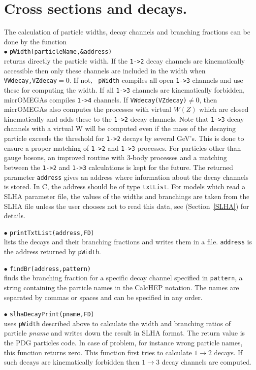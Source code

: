 \documentclass[12pt,a4paper]{article}
\begin{document}
\section{Cross sections and decays.}
\label{cross_section}

The calculation of particle widths, decay channels  and branching fractions
can be done by the function\\

\noindent
$\bullet$ \verb|pWidth(particleName,&address)|\\
returns directly the particle width. If the  \verb|1->2| 
decay channels are kinematically accessible then only these channels are
included in the width when \verb|VWdecay,VZdecay|$ = 0$.  If not, {\tt
pWidth} compiles all open \verb|1->3| channels and use these for  computing the width.
If all \verb|1->3| channels are kinematically forbidden, micrOMEGAs compiles \verb|1->4| channels.
If \verb|VWdecay(VZdecay)|$\ne 0$, then micrOMEGAs  also computes the processes with virtual $W(Z)$ which 
are closed kinematically and adds these to the \verb|1->2| decay channels.
 Note that \verb|1->3| decay channels with a virtual W  will be computed even
if the mass of the decaying particle exceeds the threshold for \verb|1->2| decays by several GeV's. This is done to ensure a 
proper matching of \verb|1->2| and \verb|1->3| processes.  For  particles other than gauge bosons,
an improved routine with 3-body processes and a matching  between
the \verb|1->2| and \verb|1->3| calculations is kept for the future. 
The returned  parameter \verb|address| 
gives  an address where information about the decay channels is stored.
In C, the address should be of type {\tt  txtList}.
For models which read a SLHA parameter file, the values of the widths and branchings are taken from the SLHA
file unless the user chooses not to read this data, see (Section~\ref{SLHA}) for details.
  

\noindent
$\bullet$ \verb|printTxtList(address,FD)|\\
lists the decays and their branching fractions and writes them in a file.
{\tt address} is the address returned by {\tt pWidth}.  

\noindent
$\bullet$ \verb|findBr(address,pattern)|\\ 
finds the branching fraction for a specific decay channel specified in
{\tt pattern},  a string containing the particle names 
in the CalcHEP notation. The names are separated by commas or spaces and can be specified in any
order. 

\noindent
$\bullet$ \verb|slhaDecayPrint(pname,FD)|\\
uses \verb|pWidth| described above to calculate the width and branching ratios of particle {\it pname} and writes down the result
in SLHA format. The return value is the PDG particles code. In case of problem, for
instance wrong particle names, this function returns zero. This function
first tries to calculate $1\to2$  decays. If such decays are kinematically
forbidden then $1\to3$ decay channels are computed. 
\end{document}
